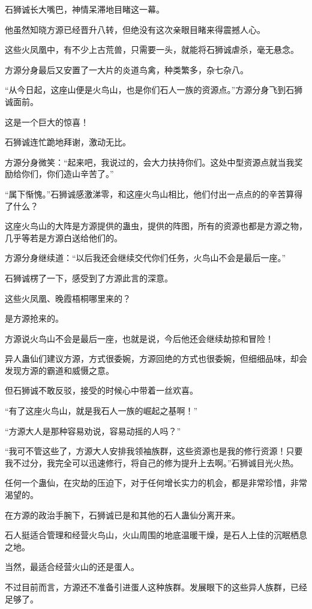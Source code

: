 \begin{this_body}
石狮诚长大嘴巴，神情呆滞地目睹这一幕。

他虽然知晓方源已经晋升八转，但绝没有这次亲眼目睹来得震撼人心。

这些火凤凰中，有不少上古荒兽，只需要一头，就能将石狮诚虐杀，毫无悬念。

方源分身最后又安置了一大片的炎道鸟禽，种类繁多，杂七杂八。

“从今日起，这座山便是火鸟山，也是你们石人一族的资源点。”方源分身飞到石狮诚面前。

这是一个巨大的惊喜！

石狮诚连忙跪地拜谢，激动无比。

方源分身微笑：“起来吧，我说过的，会大力扶持你们。这处中型资源点就当我奖励给你们，你们造山辛苦了。”

“属下惭愧。”石狮诚感激涕零，和这座火鸟山相比，他们付出一点点的的辛苦算得了什么？

这座火鸟山的大阵是方源提供的蛊虫，提供的阵图，所有的资源也都是方源之物，几乎等若是方源白送给他们的。

方源分身继续道：“以后我还会继续交代你们任务，火鸟山不会是最后一座。”

石狮诚楞了一下，感受到了方源此言的深意。

这些火凤凰、晚霞梧桐哪里来的？

是方源抢来的。

方源说火鸟山不会是最后一座，也就是说，今后他还会继续劫掠和冒险！

异人蛊仙们建议方源，方式很委婉，方源回绝的方式也很委婉，但细细品味，却会发现方源的霸道和威慑之意。

但石狮诚不敢反驳，接受的时候心中带着一丝欢喜。

“有了这座火鸟山，就是我石人一族的崛起之基啊！”

“方源大人是那种容易劝说，容易动摇的人吗？”

“我可不管这些了，方源大人安排我领袖族群，这些资源也是我的修行资源！只要我不过分，我完全可以迅速修行，将自己的修为提升上去啊。”石狮诚目光火热。

任何一个蛊仙，在灾劫的压迫下，对于任何增长实力的机会，都是非常珍惜，非常渴望的。

在方源的政治手腕下，石狮诚已是和其他的石人蛊仙分离开来。

石人挺适合管理和经营火鸟山，火山周围的地底温暖干燥，是石人上佳的沉眠栖息之地。

当然，最适合经营火山的还是蛋人。

不过目前而言，方源还不准备引进蛋人这种族群。发展眼下的这些异人族群，已经足够了。


\end{this_body}
